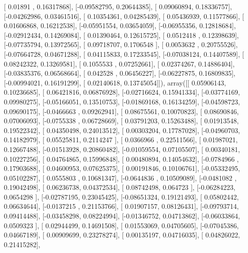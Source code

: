 \documentclass{article}
\begin{document}
       [ 0.01891   ,  0.16317868],
       [-0.09582795,  0.20644385],
       [ 0.09060894,  0.18336757],
       [-0.04262986,  0.03461516],
       [ 0.10354361,  0.04285439],
       [ 0.05436939,  0.11577866],
       [ 0.01606868,  0.16212538],
       [-0.05951554,  0.03654059],
       [-0.06955356,  0.12818684],
       [-0.02912434,  0.14269084],
       [ 0.01390464,  0.12615725],
       [ 0.0512418 ,  0.12398639],
       [-0.07735794,  0.13972565],
       [ 0.09718707,  0.1706548 ],
       [ 0.0053632 ,  0.20755526],
       [-0.07664728,  0.04671288],
       [ 0.04115833,  0.17233545],
       [-0.07038124,  0.14407589],
       [ 0.08242322,  0.13269581],
       [ 0.1055533 ,  0.07252661],
       [ 0.02374267,  0.14886404],
       [-0.03835376,  0.06568664],
       [ 0.042528  ,  0.06456227],
       [-0.06227875,  0.16809835],
       [-0.00994021,  0.16191299],
       [ 0.02140618,  0.13745054]]), array([[ 0.05906143,  0.10236685],
       [ 0.06421816,  0.06876928],
       [-0.02716624,  0.15941334],
       [-0.03774169,  0.09980275],
       [-0.05166051,  0.13510753],
       [-0.01869168,  0.16134259],
       [-0.04598723,  0.09690175],
       [-0.0466663 ,  0.09262941],
       [ 0.08675561,  0.10070823],
       [ 0.08690846,  0.07006093],
       [-0.0755338 ,  0.06728669],
       [ 0.03791203,  0.15263488],
       [ 0.01913548,  0.19522342],
       [ 0.04350498,  0.24013512],
       [ 0.00303204,  0.17787028],
       [-0.04960703,  0.14182979],
       [ 0.05525811,  0.2114247 ],
       [ 0.0366966 ,  0.22511566],
       [ 0.01987021,  0.12667488],
       [-0.01513928,  0.20860482],
       [-0.01059554,  0.07105507],
       [ 0.00340181,  0.10227256],
       [ 0.04764865,  0.15996848],
       [ 0.00480894,  0.14054632],
       [-0.0784966 ,  0.17903688],
       [ 0.04600953,  0.07625375],
       [ 0.00191846,  0.10106761],
       [-0.05332495,  0.05102287],
       [ 0.0555803 ,  0.10681347],
       [-0.0644836 ,  0.10509089],
       [-0.0481082 ,  0.19042498],
       [ 0.06236738,  0.04372534],
       [ 0.08742498,  0.064723  ],
       [-0.06284223,  0.0654298 ],
       [-0.02787195,  0.23045425],
       [-0.08651324,  0.19121493],
       [ 0.05802442,  0.06634644],
       [-0.0137215 ,  0.21153766],
       [ 0.01907157,  0.08126431],
       [-0.09793714,  0.09414488],
       [-0.03458298,  0.08224994],
       [-0.01346752,  0.04713862],
       [-0.06033864,  0.0509323 ],
       [ 0.02944499,  0.14691508],
       [ 0.01553069,  0.04705605],
       [-0.07045386,  0.04667189],
       [ 0.00909699,  0.23278274],
       [ 0.00135197,  0.04716035],
       [ 0.04826022,  0.21415282],
\end{document}
